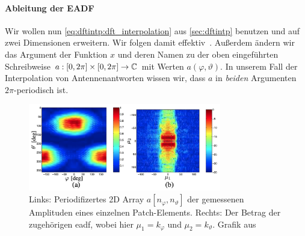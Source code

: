 %
%
%
%
\paragraph{Ableitung der EADF}
%
%
Wir wollen nun \eqref{eq:dftintp:dft_interpolation} aus \cref{sec:dftintp} benutzen und auf zwei Dimensionen erweitern. Wir folgen damit effektiv~\cite{landmann2004EADF}.
Au{\ss}erdem \"andern wir das Argument der Funktion $x$ und deren Namen zu der oben eingef\"uhrten Schreibweise $a : [0, 2 \pi] \times [0, 2 \pi] \rightarrow \mathbb{C}$ mit Werten $a(\varphi, \vartheta)$. 
In unserem Fall der Interpolation von Antennenantworten wissen wir, dass $a$ in \emph{beiden} Argumenten $2\pi$-periodisch ist.

\begin{figure}[t]
    \centering\includegraphics[width=0.75\textwidth]{img/eadf/bp_aperture.png}
    \caption{Links: Periodifizertes 2D Array $a[n_\varphi, n_\vartheta]$ der gemessenen Amplituden eines einzelnen Patch-Elements. Rechts: Der Betrag der zugeh\"origen \gls{eadf}, wobei hier $\mu_1 = k_\varphi$ und $\mu_2 = k_\vartheta$. Grafik aus~\cite{landmann2004EADF}}\label{eadf_bp_aperture}
\end{figure}

